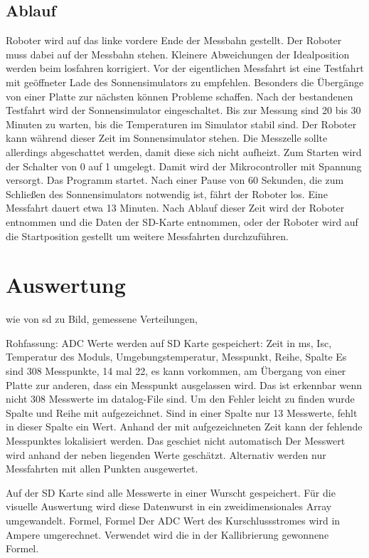 \documentclass[a4paper,bibtotoc,oneside]{scrbook}
\begin{document}
\subsection{Ablauf}\thispagestyle{empty}

Roboter wird auf das linke vordere Ende der Messbahn gestellt. Der Roboter muss dabei auf der Messbahn stehen. Kleinere Abweichungen der Idealposition werden beim losfahren korrigiert. 
Vor der eigentlichen Messfahrt ist eine Testfahrt mit geöffneter Lade des Sonnensimulators zu empfehlen. Besonders die Übergänge von einer Platte zur nächsten können Probleme schaffen.
Nach der bestandenen Testfahrt wird der Sonnensimulator eingeschaltet. Bis zur Messung sind 20 bis 30 Minuten zu warten, bis die Temperaturen im Simulator stabil sind. Der Roboter kann während dieser Zeit im Sonnensimulator stehen. Die Messzelle sollte allerdings abgeschattet werden, damit diese sich nicht aufheizt. 
Zum Starten wird der Schalter von 0 auf 1 umgelegt. Damit wird der Mikrocontroller mit Spannung versorgt. Das Programm startet. Nach einer Pause von 60 Sekunden, die zum Schließen des Sonnensimulators notwendig ist, fährt der Roboter los. Eine Messfahrt dauert etwa 13 Minuten. Nach Ablauf dieser Zeit wird der Roboter entnommen und die Daten der SD-Karte entnommen, oder der Roboter wird auf die Startposition gestellt um weitere Messfahrten durchzuführen.


\section{Auswertung}\thispagestyle{empty}


wie von sd  zu Bild,
gemessene Verteilungen,

Rohfassung: ADC Werte werden auf SD Karte gespeichert:
Zeit in ms, Isc, Temperatur des Moduls, Umgebungstemperatur, Messpunkt, Reihe, Spalte
Es sind 308 Messpunkte, 14 mal 22, es kann vorkommen, am Übergang von einer Platte zur anderen, dass ein Messpunkt ausgelassen wird. Das ist erkennbar wenn nicht 308 Messwerte im datalog-File sind. Um den Fehler leicht zu finden wurde Spalte und Reihe mit aufgezeichnet. Sind in einer Spalte nur 13 Messwerte, fehlt in dieser Spalte ein Wert. Anhand der mit aufgezeichneten Zeit kann der fehlende Messpunktes lokalisiert werden. Das geschiet nicht automatisch Der Messwert wird anhand der neben liegenden Werte geschätzt. Alternativ werden nur Messfahrten mit allen Punkten ausgewertet.

Auf der SD Karte sind alle Messwerte in einer Wurscht gespeichert. Für die visuelle Auswertung wird diese Datenwurst in ein zweidimensionales Array umgewandelt. 
Formel, Formel
Der ADC Wert des Kurschlussstromes wird in Ampere umgerechnet. Verwendet wird die in der Kallibrierung gewonnene Formel.
\end{document}
